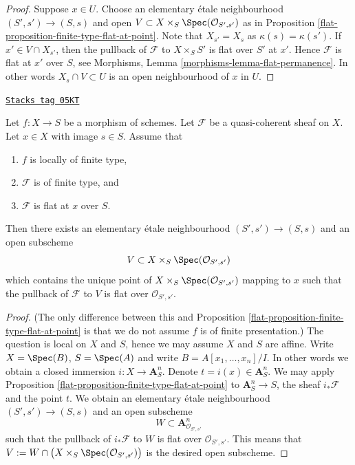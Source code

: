 \begin{proof}

Suppose $x \in U$. Choose an elementary \'etale neighbourhood
$(S', s') \to (S, s)$ and open
$V \subset X \times_S \Spec(\mathcal{O}_{S', s'})$ as in
Proposition \ref{flat-proposition-finite-type-flat-at-point}.
Note that $X_{s'} = X_s$ as $\kappa(s) = \kappa(s')$.
If $x' \in V \cap X_{s'}$, then the pullback of $\mathcal{F}$ to
$X \times_S S'$ is flat over $S'$ at $x'$. Hence $\mathcal{F}$ is
flat at $x'$ over $S$, see
Morphisms, Lemma \ref{morphisms-lemma-flat-permanence}.
In other words $X_s \cap V \subset U$ is an open neighbourhood
of $x$ in $U$.
\end{proof}

\begin{lemma}
\label{flat-lemma-finite-type-flat-at-point}
\href{https://stacks.math.columbia.edu/tag/05KT}{\texttt{Stacks tag 05KT}}

Let $f : X \to S$ be a morphism of schemes.
Let $\mathcal{F}$ be a quasi-coherent sheaf on $X$.
Let $x \in X$ with image $s \in S$.
Assume that
\begin{enumerate}
\item $f$ is locally of finite type,
\item $\mathcal{F}$ is of finite type, and
\item $\mathcal{F}$ is flat at $x$ over $S$.
\end{enumerate}
Then there exists an elementary \'etale neighbourhood $(S', s') \to (S, s)$
and an open subscheme
$$
V \subset X \times_S \Spec(\mathcal{O}_{S', s'})
$$
which contains the unique point of
$X \times_S \Spec(\mathcal{O}_{S', s'})$ mapping to $x$
such that the pullback of $\mathcal{F}$ to $V$ is flat over
$\mathcal{O}_{S', s'}$.
\end{lemma}

\begin{proof}

(The only difference between this and
Proposition \ref{flat-proposition-finite-type-flat-at-point}
is that we do not assume $f$ is of finite presentation.)
The question is local on $X$ and $S$, hence we may assume $X$ and $S$
are affine. Write $X = \Spec(B)$, $S = \Spec(A)$ and write
$B = A[x_1, \ldots, x_n]/I$. In other words we obtain a closed immersion
$i : X \to \mathbf{A}^n_S$. Denote $t = i(x) \in \mathbf{A}^n_S$.
We may apply
Proposition \ref{flat-proposition-finite-type-flat-at-point}
to $\mathbf{A}^n_S \to S$, the sheaf $i_*\mathcal{F}$
and the point $t$. We obtain an elementary
\'etale neighbourhood $(S', s') \to (S, s)$ and an open subscheme
$$
W \subset \mathbf{A}^n_{\mathcal{O}_{S', s'}}
$$
such that the pullback of $i_*\mathcal{F}$ to $W$ is flat over
$\mathcal{O}_{S', s'}$. This means that
$V := W \cap \big(X \times_S \Spec(\mathcal{O}_{S', s'})\big)$
is the desired open subscheme.
\end{proof}

